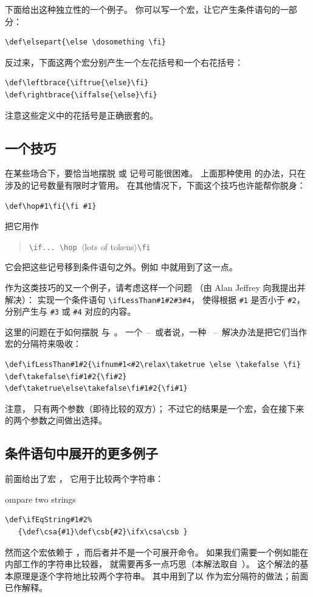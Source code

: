 \documentclass[a4paper]{rapport3}
\def\gr#1{$\langle$#1$\rangle$}\def\key#1{{\tt#1}}
\def\alt{}\def\altt{}%
\def\ldash{\unskip\ --\nobreak\ \ignorespaces}
\def\rdash{\unskip\nobreak\ --\ \ignorespaces}
\newenvironment{disp}{\begin{quotation}}{\end{quotation}}
\def\howto#1\par{}
\begin{document}
下面给出这种独立性的一个例子。
你可以写一个宏，让它产生条件语句的一部分：
\begin{verbatim}
\def\elsepart{\else \dosomething \fi}
\end{verbatim}
反过来，下面这两个宏分别产生一个左花括号和一个右花括号：
\begin{verbatim}
\def\leftbrace{\iftrue{\else}\fi}
\def\rightbrace{\iffalse{\else}\fi}
\end{verbatim}
注意这些定义中的花括号是正确嵌套的。

\subsection{一个技巧}

在某些场合下，要恰当地摆脱  或  记号可能很困难。
上面那种使用  的办法，只在涉及的记号数量有限时才管用。
在其他情况下，下面这个技巧也许能帮你脱身：
\begin{verbatim}
\def\hop#1\fi{\fi #1}
\end{verbatim}
把它用作
\begin{disp}\verb>\if... \hop >\gr{lots of tokens}\verb>\fi>\end{disp}
它会把这些记号移到条件语句之外。例如 \cite{E2} 中就用到了这一点。

作为这类技巧的又一个例子，请考虑这样一个问题
（由 Alan Jeffrey 向我提出并解决）：
实现一个条件语句 \verb-\ifLessThan#1#2#3#4-，
使得根据 \verb-#1- 是否小于 \verb-#2-，
分别产生与 \verb-#3- 或 \verb-#4- 对应的内容。

这里的问题在于如何摆脱  与~。
一个\ldash 或者说，一种 \rdash 解决办法是把它们当作宏的分隔符来吸收：
\begin{verbatim}
\def\ifLessThan#1#2{\ifnum#1<#2\relax\taketrue \else \takefalse \fi}
\def\takefalse\fi#1#2{\fi#2}
\def\taketrue\else\takefalse\fi#1#2{\fi#1}
\end{verbatim}
注意， 只有两个参数（即待比较的双方）；
不过它的结果是一个宏，会在接下来的两个参数之间做出选择。

\subsection{条件语句中展开的更多例子}

前面给出了宏 ，\alt
它用于比较两个字符串：
\howto Compare two strings\par
\begin{verbatim}
\def\ifEqString#1#2%
   {\def\csa{#1}\def\csb{#2}\ifx\csa\csb }
\end{verbatim}
然而这个宏依赖于 ，而后者并不是一个可展开命令。
如果我们需要一个例如能在  内部工作的字符串比较器，
就需要再多一点巧思（本解法取自~\cite{E2}）。
这个解法的基本原理是逐个字符地比较两个字符串。
其中用到了以  作为宏分隔符的做法；前面已作解释。
\end{document}
